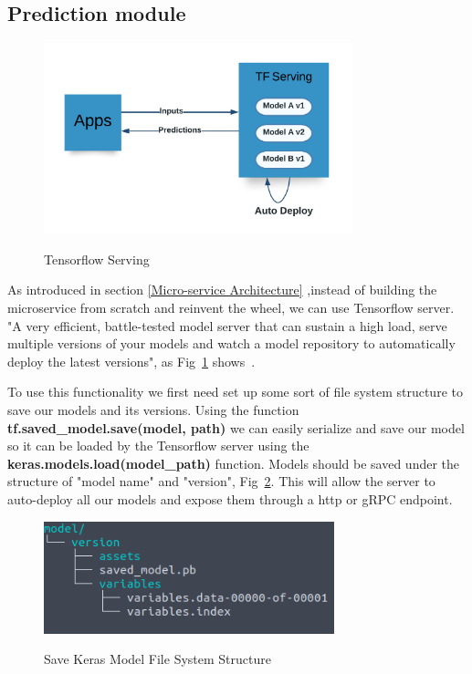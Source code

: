 \newpage
\subsection{Prediction module}
\label{prediction-module}

\begin{figure}[h]
    \centering
    \caption{Tensorflow Serving}
    \includegraphics[width=0.8\textwidth]{figures/serving.png}
    \label{fig:serving}
\end{figure}

As introduced in section \ref{Micro-service Architecture} ,instead of building the microservice from scratch and reinvent the wheel, we can use Tensorflow server. "A very efficient, battle-tested model server that can sustain a high load, serve multiple versions of your models and watch a model repository to automatically deploy the latest versions", as Fig~\ref{fig:serving} shows~\cite{handsOnMachine}.

To use this functionality we first need set up some sort of file system structure to save our models and its versions. Using the function \textbf{tf.saved\_model.save(model, path)} we can easily serialize and save our model so it can be loaded by the Tensorflow server using the \textbf{keras.models.load(model\_path)} function. Models should be saved under the structure of "model name" and "version", Fig~\ref{fig:model-save}. This will allow the server to auto-deploy all our models and expose them through a http or gRPC endpoint.

\begin{figure}[h]
    \centering
    \caption{Save Keras Model File System Structure}
    \includegraphics[width=0.75\textwidth]{figures/model-save.png}
    \label{fig:model-save}
\end{figure}

